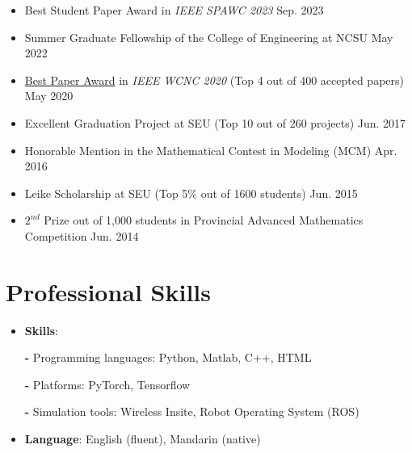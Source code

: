 \documentclass[letterpaper,10pt]{article}
\newcommand{\resumeItem}[2]{
  \item\small{
    \textbf{#1}{#2 \vspace{-2pt}}
  }
}
\newcommand{\projcontent}[1]{\vspace{-1pt}\textbf{- }{\small #1}\vspace{-3pt}}
\newcommand{\resumeSubItem}[2]{\resumeItem{#1}{#2}\vspace{-2pt}}
\newcommand{\resumeItemListStart}{\vspace{-2pt}\begin{itemize}[leftmargin=*]}
\newcommand{\resumeItemListEnd}{\end{itemize}}
\begin{document}
\resumeItemListStart
\resumeSubItem{}{Best Student Paper Award in \textit{IEEE SPAWC 2023}
\hfill
Sep. 2023
}
\resumeSubItem{}{Summer Graduate Fellowship of the College of Engineering at NCSU
\hfill
May 2022
}

\resumeSubItem{}{\href{https://wcnc2020.ieee-wcnc.org/program/ieee-wcnc-2020-best-paper-selection}{Best Paper Award} in \textit{IEEE WCNC 2020} (Top 4 out of 400 accepted papers)
\hfill
May 2020
}
\resumeSubItem{}{Excellent Graduation Project at SEU (Top 10 out of 260 projects)
\hfill
Jun. 2017
}
 \resumeSubItem{}
 {Honorable Mention in the Mathematical Contest in Modeling (MCM)
      \hfill
      Apr. 2016
}
 \resumeSubItem{}{Leike Scholarship at SEU (Top 5\% out of 1600 students)
\hfill
Jun. 2015
}
 \resumeSubItem{}{$2^{nd}$ Prize out of 1,000 students in Provincial Advanced Mathematics Competition
\hfill
Jun. 2014
}

\resumeItemListEnd

\section{Professional Skills}
\resumeItemListStart
\resumeSubItem{}
{\textbf{Skills}:}

\projcontent{Programming languages: Python, Matlab, C++, HTML}

\projcontent{Platforms: PyTorch, Tensorflow}

\projcontent{Simulation tools: Wireless Insite, Robot Operating System (ROS)}

\resumeSubItem{}
      {\textbf{Language}{: English (fluent), Mandarin (native)}}

  \resumeItemListEnd


\end{document}

